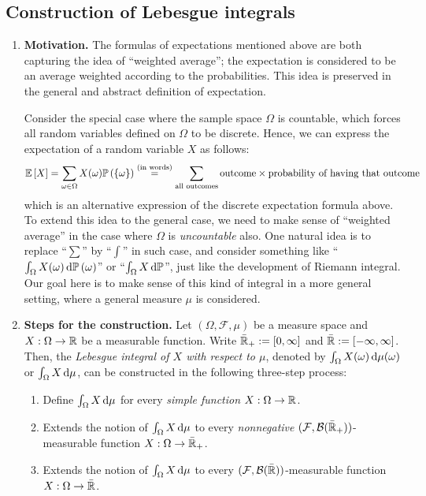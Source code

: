 \subsection{Construction of Lebesgue integrals}
\label{subsect:construct-lebesgue-int}
\begin{enumerate}
\item \textbf{Motivation.} The formulas of expectations mentioned above are
both capturing the idea of ``weighted average''; the expectation is considered
to be an average weighted according to the probabilities. This idea is
preserved in the general and abstract definition of expectation.

Consider the special case where the sample space \(\Omega\) is countable, which
forces all random variables defined on \(\Omega\) to be discrete. Hence, we can
express the expectation of a random variable \(X\) as follows:
\[
\mathbb{E}\left[X\right]=\sum_{\omega\in\Omega}^{}X(\omega)\mathbb{P}\left(\{\omega\}\right)
\overset{\text{(in words)}}{=}
\sum_{\text{all outcomes}}^{}\text{outcome}\times \text{probability of having that outcome}
\]
which is an alternative expression of the discrete expectation formula above.
To extend this idea to the general case, we need to make sense of ``weighted
average'' in the case where \(\Omega\) is \emph{uncountable} also. One natural
idea is to replace ``\(\sum\)'' by ``\(\int\)'' in such case, and consider
something like ``\(\int_{\Omega}^{}X(\omega)\odif{\prob{\omega}}\)'' or
``\(\int_{\Omega}^{}X\odif{\pr}\)'', just like the development of Riemann
integral.  Our goal here is to make sense of this kind of integral in a more
general setting, where a general measure \(\mu\) is considered.
\item \textbf{Steps for the construction.} Let \((\Omega,\mathcal{F},\mu)\) be
a measure space and \(X:\Omega\to\mathbb{R}\) be a measurable function. Write
\(\bar{\mathbb{R}}_{+}:=[0,\infty]\) and \(\bar{\mathbb{R}}:=[-\infty,\infty]\).  Then, the
\emph{Lebesgue integral of \(X\) with respect to \(\mu\)}, denoted by
\(\int_{\Omega}^{}X(\omega)\odif{\mu(\omega)}\) or
\(\int_{\Omega}^{}X\odif{\mu}\), can be constructed in the following three-step
process:
\begin{enumerate}[label={(\arabic*)}]
\item Define \(\int_{\Omega}^{}X\odif{\mu}\) for every \emph{simple function} \(X:\Omega\to\mathbb{R}\).
\item Extends the notion of \(\int_{\Omega}^{}X\odif{\mu}\) to every
\emph{nonnegative} \((\mathcal{F},\mathcal{B}(\bar{\mathbb{R}}_{+}))\)-measurable function
\(X:\Omega\to\bar{\mathbb{R}}_{+}\).
\item Extends the notion of \(\int_{\Omega}^{}X\odif{\mu}\) to every
\((\mathcal{F},\mathcal{B}(\bar{\mathbb{R}}))\)-measurable function
\(X:\Omega\to\bar{\mathbb{R}}\).


\end{enumerate}
\end{enumerate}
